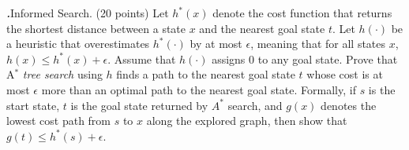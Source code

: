 \documentclass[12pt]{amsart}
\newenvironment{statement}[1]{\smallskip\noindent\color[rgb]{0.0,0.0,0.0} {\bf #1.}}{}
\theoremstyle{definition}
\theoremstyle{remark}
\newcommand{\1}{\mathds{1}}
\begin{document}
\newpage
\begin{statement}{3} \textit{Informed Search.} (20 points) Let $h^*(x)$ denote the cost function that returns the shortest distance between a state $x$ and the nearest goal state $t$. Let $h(\cdot)$ be a heuristic that overestimates $h^*(\cdot)$ by at most $\epsilon$, meaning that for all states $x$, $h(x) \leq h^*(x) + \epsilon$. Assume that $h(\cdot)$ assigns $0$ to any goal state. Prove that A$^*$ \textit{tree search} using $h$ finds a path to the nearest goal state $t$ whose cost is at most $\epsilon$ more than an optimal path to the nearest goal state. Formally, if $s$ is the start state, $t$ is the goal state returned by $A^*$ search, and $g(x)$ denotes the lowest cost path from $s$ to $x$ along the explored graph, then show that $g(t) \leq h^*(s) + \epsilon$.

\end{statement}
\end{document}
